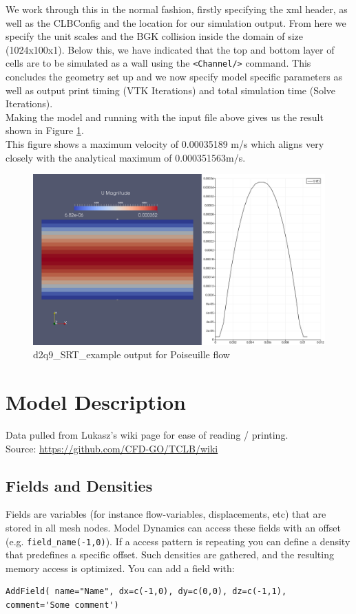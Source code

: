\documentclass[12pt,a4paper]{report}
\begin{document}
We work through this in the normal fashion, firstly specifying the xml header, as well as the CLBConfig and the location for our simulation output. From here we specify the unit scales and the BGK collision inside the domain of size (1024x100x1). Below this, we have indicated that the top and bottom layer of cells are to be simulated as a wall using the \lstinline$<Channel/>$ command. This concludes the geometry set up and we now specify model specific parameters as well as output print timing (VTK Iterations) and total simulation time (Solve Iterations).\\

Making the model and running with the input file above gives us the result shown in Figure \ref{fig:d2q9_SRT_example}. \\

This figure shows a maximum velocity of 0.00035189 m/s which aligns very closely with the analytical maximum of 0.000351563m/s.
\begin{figure}[!h]
\centering
\includegraphics[width=1.0\textwidth]{figures/d2q9_SRT_verification.png}
\caption{d2q9\_SRT\_example output for Poiseuille flow}
\label{fig:d2q9_SRT_example}
\end{figure}


\newpage
\section{Model Description} \label{sec:Model Description}
Data pulled from Lukasz's wiki page for ease of reading / printing. \\
Source: \url{https://github.com/CFD-GO/TCLB/wiki}
\subsection{Fields and Densities}
Fields are variables (for instance flow-variables, displacements, etc) that are stored in all mesh nodes. Model Dynamics can access these fields with an offset (e.g. \lstinline$field_name(-1,0)$). If a access pattern is repeating you can define a density that predefines a specific offset. Such densities are gathered, and the resulting memory access is optimized. You can add a field with:
\begin{lstlisting}
AddField( name="Name", dx=c(-1,0), dy=c(0,0), dz=c(-1,1), comment='Some comment')
\end{lstlisting}
\end{document}
